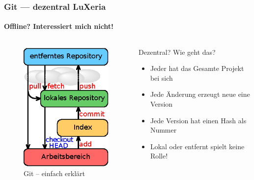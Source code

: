\begin{frame}
    \frametitle{Git --- dezentral \hfill{} LuXeria}
    \framesubtitle{Offline? Interessiert mich nicht!}
    \begin{columns}
        \begin{column}{5cm}
            \begin{figure}
                \includegraphics[scale=1.2]{git_local.eps}
                \caption{Git -- einfach erklärt}
            \end{figure}
        \end{column}
        \begin{column}{5cm}
            \begin{block}{Dezentral? Wie geht das?}
                \begin{itemize}
                    \item Jeder hat das Gesamte Projekt bei sich
                    \item Jede Änderung erzeugt neue eine Version
                    \item Jede Version hat einen Hash als Nummer
                    \item Lokal oder entfernt spielt keine Rolle!
                \end{itemize}
            \end{block}
        \end{column}
    \end{columns}
\end{frame}

